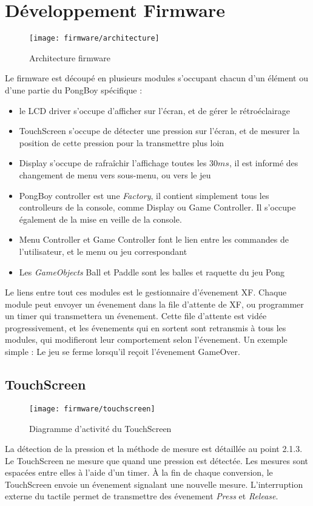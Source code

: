 \section{Développement Firmware}
\begin{figure}[H]
  \centering
  \texttt{[image: firmware/architecture]}
  \caption{Architecture firmware}
  \label{firm_arc}
\end{figure}
Le firmware est découpé en plusieurs modules s'occupant chacun d'un élément
ou d'une partie du PongBoy spécifique :
\begin{itemize}
  \item le LCD driver s'occupe d'afficher sur l'écran, et de gérer le
  rétroéclairage
  \item TouchScreen s'occupe de détecter une pression sur l'écran, et
  de mesurer la position de cette pression pour la transmettre plus loin
  \item Display s'occupe de rafraîchir l'affichage toutes les $30ms$, il
  est informé des changement de menu vers sous-menu, ou vers le jeu
  \item PongBoy controller est une \emph{Factory}, il contient simplement
  tous les controlleurs de la console, comme Display ou Game Controller.
  Il s'occupe également de la mise en veille de la console.
  \item Menu Controller et Game Controller font le lien entre les
  commandes de l'utilisateur, et le menu ou jeu correspondant
  \item Les \emph{GameObjects} Ball et Paddle sont les balles et
  raquette du jeu Pong
\end{itemize}

Le liens entre tout ces modules est le gestionnaire d'évenement XF.
Chaque module peut envoyer un évenement dans la file d'attente de XF, ou
programmer un timer qui transmettera un évenement.
Cette file d'attente est vidée progressivement, et les évenements qui en sortent
sont retransmis à tous les modules, qui modifieront leur comportement selon
l'évenement. Un exemple simple : Le jeu se ferme lorsqu'il reçoit l'évenement
GameOver.

\subsection{TouchScreen}
\begin{figure}[H]
  \centering
  \texttt{[image: firmware/touchscreen]}
  \caption{Diagramme d'activité du TouchScreen}
  \label{firm_touch}
\end{figure}
La détection de la pression et la méthode de mesure est détaillée au
point 2.1.3.
Le TouchScreen ne mesure que quand une pression est détectée. Les mesures
sont espacées entre elles à l'aide d'un timer.
À la fin de chaque conversion, le TouchScreen envoie un évenement signalant
une nouvelle mesure.
L'interruption externe du tactile permet de transmettre des évenement
\emph{Press} et \emph{Release}.
\newpage

